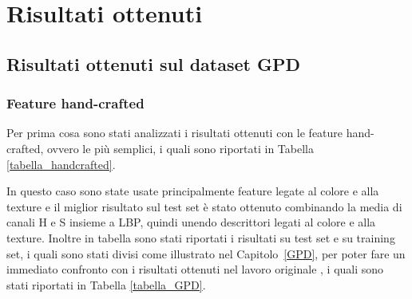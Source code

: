 \chapter{Risultati ottenuti}
\label{risultati}

\section{Risultati ottenuti sul dataset GPD}
\subsection{Feature hand-crafted}

Per prima cosa sono stati analizzati i risultati ottenuti con le feature hand-crafted, ovvero le più semplici, i quali sono riportati in Tabella \ref{tabella_handcrafted}.

\begin{table}[H]
\caption{Livelli di accuratezza ottenuti sul training set e sul test set utilizzando diverse combinazioni di feature e il classificatore SVM}
\label{tabella_handcrafted}
\end{table}

In questo caso sono state usate principalmente feature legate al colore e alla texture e il miglior risultato sul test set è stato ottenuto combinando la media di canali H e S insieme a LBP, quindi unendo descrittori legati al colore e alla texture. Inoltre in tabella sono stati riportati i risultati su test set e su training set, i quali sono stati divisi come illustrato nel Capitolo~\ref{GPD}, per poter fare un immediato confronto con i risultati ottenuti nel lavoro originale \cite{sheng2021learning}, i quali sono stati riportati in Tabella \ref{tabella_GPD}. 

